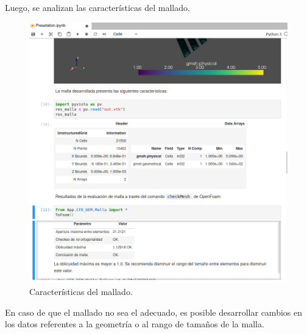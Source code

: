 \newpage

\noindent
\justify

Luego, se analizan las caracter\'isticas del mallado.

\begin{figure}[h!]
	\centering
	\includegraphics[width=\textwidth]{Images/Anexos/9.png}
	\caption{Caracter\'isticas del mallado.}
	\label{CarMallaSoft}
\end{figure}

\newpage

\noindent
\justify

En caso de que el mallado no sea el adecuado, es posible desarrollar cambios en los datos referentes a la geometr\'ia o al rango de tama\~nos de la malla.

